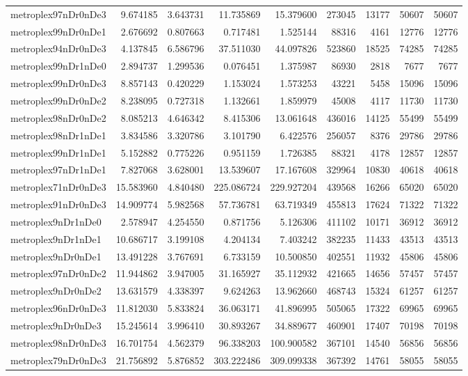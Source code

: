 \begin{longtable}{|l|r|r|r|r|r|r|r|r|}
metroplex97nDr0nDe3 & 9.674185 & 3.643731 & 11.735869 & 15.379600 & 273045 & 13177 & 50607 & 50607 \\
metroplex99nDr0nDe1 & 2.676692 & 0.807663 & 0.717481 & 1.525144 & 88316 & 4161 & 12776 & 12776 \\
metroplex94nDr0nDe3 & 4.137845 & 6.586796 & 37.511030 & 44.097826 & 523860 & 18525 & 74285 & 74285 \\
metroplex99nDr1nDe0 & 2.894737 & 1.299536 & 0.076451 & 1.375987 & 86930 & 2818 & 7677 & 7677 \\
metroplex99nDr0nDe3 & 8.857143 & 0.420229 & 1.153024 & 1.573253 & 43221 & 5458 & 15096 & 15096 \\
metroplex99nDr0nDe2 & 8.238095 & 0.727318 & 1.132661 & 1.859979 & 45008 & 4117 & 11730 & 11730 \\
metroplex98nDr0nDe2 & 8.085213 & 4.646342 & 8.415306 & 13.061648 & 436016 & 14125 & 55499 & 55499 \\
metroplex98nDr1nDe1 & 3.834586 & 3.320786 & 3.101790 & 6.422576 & 256057 & 8376 & 29786 & 29786 \\
metroplex99nDr1nDe1 & 5.152882 & 0.775226 & 0.951159 & 1.726385 & 88321 & 4178 & 12857 & 12857 \\
metroplex97nDr1nDe1 & 7.827068 & 3.628001 & 13.539607 & 17.167608 & 329964 & 10830 & 40618 & 40618 \\
metroplex71nDr0nDe3 & 15.583960 & 4.840480 & 225.086724 & 229.927204 & 439568 & 16266 & 65020 & 65020 \\
metroplex91nDr0nDe3 & 14.909774 & 5.982568 & 57.736781 & 63.719349 & 455813 & 17624 & 71322 & 71322 \\
metroplex9nDr1nDe0 & 2.578947 & 4.254550 & 0.871756 & 5.126306 & 411102 & 10171 & 36912 & 36912 \\
metroplex9nDr1nDe1 & 10.686717 & 3.199108 & 4.204134 & 7.403242 & 382235 & 11433 & 43513 & 43513 \\
metroplex9nDr0nDe1 & 13.491228 & 3.767691 & 6.733159 & 10.500850 & 402551 & 11932 & 45806 & 45806 \\
metroplex97nDr0nDe2 & 11.944862 & 3.947005 & 31.165927 & 35.112932 & 421665 & 14656 & 57457 & 57457 \\
metroplex9nDr0nDe2 & 13.631579 & 4.338397 & 9.624263 & 13.962660 & 468743 & 15324 & 61257 & 61257 \\
metroplex96nDr0nDe3 & 11.812030 & 5.833824 & 36.063171 & 41.896995 & 505065 & 17322 & 69965 & 69965 \\
metroplex9nDr0nDe3 & 15.245614 & 3.996410 & 30.893267 & 34.889677 & 460901 & 17407 & 70198 & 70198 \\
metroplex98nDr0nDe3 & 16.701754 & 4.562379 & 96.338203 & 100.900582 & 367101 & 14540 & 56856 & 56856 \\
metroplex79nDr0nDe3 & 21.756892 & 5.876852 & 303.222486 & 309.099338 & 367392 & 14761 & 58055 & 58055 \\
\end{longtable}
